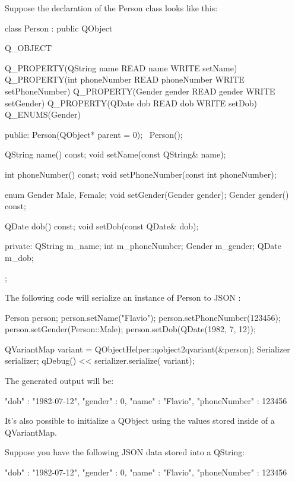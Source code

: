 \-Suppose the declaration of the \-Person class looks like this\-: 
\begin{DoxyCode}
 class Person : public QObject
    {
      Q_OBJECT

      Q_PROPERTY(QString name READ name WRITE setName)
      Q_PROPERTY(int phoneNumber READ phoneNumber WRITE setPhoneNumber)
      Q_PROPERTY(Gender gender READ gender WRITE setGender)
      Q_PROPERTY(QDate dob READ dob WRITE setDob)
      Q_ENUMS(Gender)

     public:
        Person(QObject* parent = 0);
        ~Person();

        QString name() const;
        void setName(const QString& name);

        int phoneNumber() const;
        void setPhoneNumber(const int  phoneNumber);

        enum Gender {Male, Female};
        void setGender(Gender gender);
        Gender gender() const;

        QDate dob() const;
        void setDob(const QDate& dob);

      private:
        QString m_name;
        int m_phoneNumber;
        Gender m_gender;
        QDate m_dob;
    };
\end{DoxyCode}


\-The following code will serialize an instance of \-Person to \-J\-S\-O\-N \-:


\begin{DoxyCode}
    Person person;
    person.setName("Flavio");
    person.setPhoneNumber(123456);
    person.setGender(Person::Male);
    person.setDob(QDate(1982, 7, 12));

    QVariantMap variant = QObjectHelper::qobject2qvariant(&person);
    Serializer serializer;
    qDebug() << serializer.serialize( variant);
\end{DoxyCode}


\-The generated output will be\-: 
\begin{DoxyCode}
    { "dob" : "1982-07-12", "gender" : 0, "name" : "Flavio", "phoneNumber" : 
      123456 }
\end{DoxyCode}


\-It's also possible to initialize a \-Q\-Object using the values stored inside of a \-Q\-Variant\-Map.

\-Suppose you have the following \-J\-S\-O\-N data stored into a \-Q\-String\-: 
\begin{DoxyCode}
    { "dob" : "1982-07-12", "gender" : 0, "name" : "Flavio", "phoneNumber" : 
      123456 }
\end{DoxyCode}


